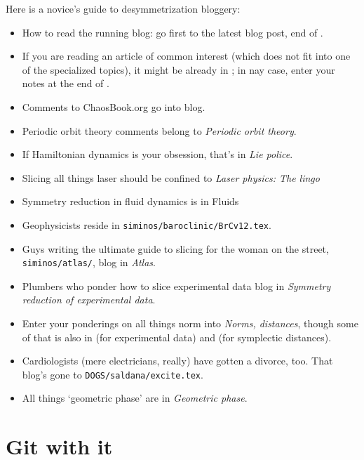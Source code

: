 Here is a novice's guide to desymmetrization bloggery:
\begin{itemize}
  \item
How to read the running blog: go first to the latest blog post, end
of .
  \item
If you are reading an article of common interest (which does not fit into
one of the specialized topics), it might be already in ;
in nay case, enter your notes at the end of .
  \item
Comments to ChaosBook.org go into  blog.
  \item
Periodic orbit theory comments belong to  {\em
Periodic orbit theory}.
  \item
If Hamiltonian dynamics is your obsession, that's in
 {\em Lie police}.
  \item
Slicing all things laser should be confined to
 {\em Laser physics: The lingo}
  \item
Symmetry reduction in fluid dynamics is in  {Fluids}
  \item
Geophysicists reside in
\texttt{siminos/baroclinic/BrCv12.tex}.
  \item
Guys writing the ultimate guide to slicing for the woman on the street,
\texttt{siminos/atlas/}, blog in  {\em Atlas}.
  \item
Plumbers who ponder how to slice experimental data blog in
 {\em Symmetry reduction of experimental data}.
  \item
Enter your ponderings on all things norm into 
\emph{Norms, distances}, though some of that is also in 
(for experimental data) and  (for symplectic
distances).
  \item
Cardiologists (mere electricians, really) have gotten a divorce, too. That
blog's gone to \texttt{DOGS/saldana/excite.tex}.
  \item
All things `{geometric phase}' are in  {\em
Geometric phase}.

\end{itemize}


\section{Git with it}

